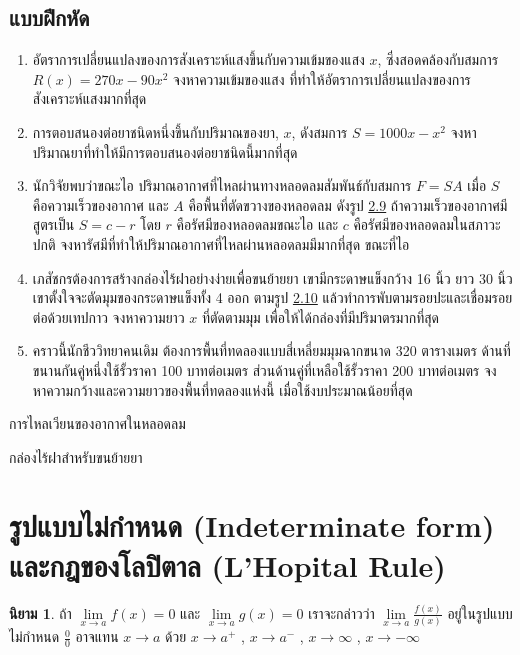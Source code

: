\documentclass[
]{book}
\theoremstyle{definition}
\newtheorem{definition}{นิยาม}[chapter]
\theoremstyle{definition}
\theoremstyle{definition}
\theoremstyle{definition}
\theoremstyle{remark}
\begin{document}
\subsection{แบบฝึกหัด}\label{uxe41uxe1auxe1auxe1duxe01uxe2buxe14-6}

\begin{enumerate}
\def\labelenumi{\arabic{enumi}.}
\item
  อัตราการเปลี่ยนแปลงของการสังเคราะห์แสงขึ้นกับความเข้มของแสง \(x\),
  ซึ่งสอดคล้องกับสมการ \(R(x)=270x-90x^2\) จงหาความเข้มของแสง
  ที่ทำให้อัตราการเปลี่ยนแปลงของการสังเคราะห์แสงมากที่สุด
\item
  การตอบสนองต่อยาชนิดหนึ่งขึ้นกับปริมาณของยา, \(x\), ดังสมการ \(S=1000x-x^2\)
  จงหาปริมาณยาที่ทำให้มีการตอบสนองต่อยาชนิดนี้มากที่สุด
\item
  นักวิจัยพบว่าขณะไอ ปริมาณอากาศที่ไหลผ่านทางหลอดลมสัมพันธ์กับสมการ \(F=SA\) เมื่อ \(S\)
  คือความเร็วของอากาศ และ \(A\) คือพื้นที่ตัดขวางของหลอดลม ดังรูป
  \hyperref[fig-artery]{2.9}
  ถ้าความเร็วของอากาศมีสูตรเป็น \(S=c-r\) โดย \(r\) คือรัศมีของหลอดลมขณะไอ และ \(c\)
  คือรัศมีของหลอดลมในสภาวะปกติ จงหารัศมีที่ทำให้ปริมาณอากาศที่ไหลผ่านหลอดลมมีมากที่สุด
  ขณะที่ไอ
\item
  เภสัชกรต้องการสร้างกล่องไร้ฝาอย่างง่ายเพื่อขนย้ายยา เขามีกระดาษแข็งกว้าง 16 นิ้ว
  ยาว 30 นิ้ว เขาตั้งใจจะตัดมุมของกระดาษแข็งทั้ง 4 ออก ตามรูป
  \hyperref[fig-box-area]{2.10}
  แล้วทำการพับตามรอยปะและเชื่อมรอยต่อด้วยเทปกาว จงหาความยาว \(x\) ที่ตัดตามมุม
  เพื่อให้ได้กล่องที่มีปริมาตรมากที่สุด
\item
  คราวนี้นักชีววิทยาคนเดิม ต้องการพื้นที่ทดลองแบบสี่เหลี่ยมมุมฉากขนาด 320 ตารางเมตร
  ด้านที่ขนานกันคู่หนึ่งใช้รั้วราคา 100 บาทต่อเมตร ส่วนด้านคู่ที่เหลือใช้รั้วราคา 200
  บาทต่อเมตร จงหาความกว้างและความยาวของพื้นที่ทดลองแห่งนี้ เมื่อใช้งบประมาณน้อยที่สุด
\end{enumerate}

การไหลเวียนของอากาศในหลอดลม

กล่องไร้ฝาสำหรับขนย้ายยา



\section{รูปแบบไม่กำหนด (Indeterminate form) และกฎของโลปิตาล (L'Hopital Rule)}\label{uxe23uxe1buxe41uxe1auxe1auxe44uxe21uxe01uxe33uxe2buxe19uxe14-indeterminate-form-uxe41uxe25uxe30uxe01uxe0euxe02uxe2duxe07uxe42uxe25uxe1buxe15uxe32uxe25-lhopital-rule}

\begin{definition}
ถ้า \(\mathop {\lim }\limits_{x\to a} f(x)=0\) และ \(\displaystyle \mathop
{\lim
}\limits_{x\to a} g(x)=0\) เราจะกล่าวว่า \(\displaystyle \mathop {\lim
}\limits_{x\to a}
\frac{f(x)}{g(x)}\) อยู่ในรูปแบบไม่กำหนด \(\displaystyle \frac{0}{0}\) อาจแทน
\(x\to a\) ด้วย \(x\to a^+\) , \(x\to a^-\) , \(x\to \infty\) , \(x\to -\infty\)
\end{definition}
\end{document}
